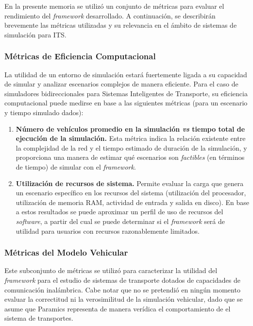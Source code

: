 En la presente memoria se utilizó un conjunto de métricas para evaluar el rendimiento del \emph{framework} desarrollado. A continuación, se describirán brevemente las métricas utilizadas y su relevancia en el ámbito de sistemas de simulación para ITS.

\subsubsection{Métricas de Eficiencia Computacional}

La utilidad de un entorno de simulación estará fuertemente ligada a su capacidad de simular y analizar escenarios complejos de manera eficiente. Para el caso de simuladores bidireccionales para Sistemas Inteligentes de Transporte, su eficiencia computacional puede medirse en base a las siguientes métricas (para un escenario y tiempo simulado dados):

\begin{enumerate}
    \item \textbf{Número de vehículos promedio en la simulación \emph{vs} tiempo total de ejecución de la simulación.} Esta métrica indica la relación existente entre la complejidad de la red y el tiempo estimado de duración de la simulación, y proporciona una manera de estimar qué escenarios son \emph{factibles} (en términos de tiempo) de simular con el \emph{framework}.
    
    \item \textbf{Utilización de recursos de sistema.} Permite evaluar la carga que genera un escenario específico en los recursos del sistema (utilización del procesador, utilización de memoria RAM, actividad de entrada y salida en disco). En base a estos resultados se puede aproximar un perfil de uso de recursos del \emph{software}, a partir del cual se puede determinar si el \emph{framework} será de utilidad para usuarios con recursos razonablemente limitados.
\end{enumerate}

\subsubsection{Métricas del Modelo Vehicular}

Este subconjunto de métricas se utilizó para caracterizar la utilidad del \emph{framework} para el estudio de sistemas de transporte dotados de capacidades de comunicación inalámbrica. Cabe notar que no se pretendió en ningún momento evaluar la correctitud ni la verosimilitud de la simulación vehicular, dado que se asume que Paramics representa de manera verídica el comportamiento de el sistema de transportes.

